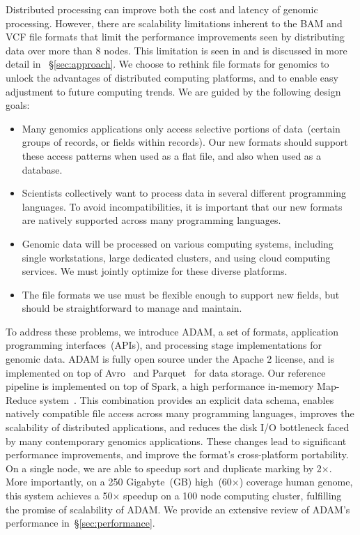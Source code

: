 \documentclass{bioinfo}
\begin{document}
Distributed processing can improve both the cost and latency of genomic processing. However, there are scalability limitations inherent to the BAM and VCF file formats that limit
the performance improvements seen by distributing data over more than 8 nodes. This limitation is seen in \citet{niemenmaa12} and is discussed in
more detail in ~\S\ref{sec:approach}. We choose to rethink file formats for genomics to unlock the advantages of distributed computing platforms, and to enable easy adjustment
to future computing trends. We are guided by the following design goals:

\begin{itemize}
\item Many genomics applications only access selective portions of data~(certain groups of records, or fields within records). Our new formats should support these access
patterns when used as a flat file, and also when used as a database.
\item Scientists collectively want to process data in several different programming languages. To avoid incompatibilities, it is important that our new formats are natively
supported across many programming languages.
\item Genomic data will be processed on various computing systems, including single workstations, large dedicated clusters,
and using cloud computing services. We must jointly optimize for these diverse platforms.
\item The file formats we use must be flexible enough to support new fields, but should be straightforward to manage and maintain.
\end{itemize}

To address these problems, we introduce ADAM, a set of formats, application programming interfaces~(APIs), and processing stage implementations for genomic data.
ADAM is fully open source under the Apache 2 license, and is implemented on top of Avro~\citep{avro} and Parquet~\citep{parquet} for data storage. Our reference pipeline
is implemented on top of Spark, a high performance in-memory Map-Reduce system~\citep{zaharia10}. This combination provides an explicit data schema, enables
natively compatible file access across many programming languages, improves the scalability of distributed applications, and reduces the disk I/O bottleneck faced by many
contemporary genomics applications. These changes lead to significant performance improvements, and improve the format's cross-platform portability. On a single
node, we are able to speedup sort and duplicate marking by 2$\times$. More importantly, on a 250 Gigabyte~(GB) high~(60$\times$) coverage
human genome, this system achieves a 50$\times$ speedup on a 100 node computing cluster, fulfilling the promise of scalability of ADAM.
We provide an extensive review of ADAM's performance in~\S\ref{sec:performance}.
\end{document}
